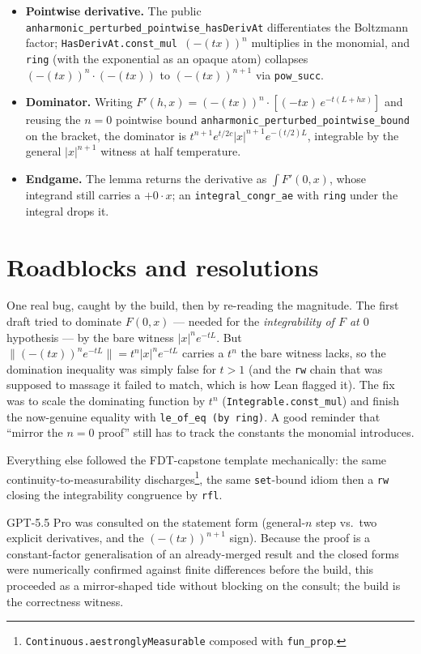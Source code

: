 \documentclass[11pt]{article}
\begin{document}
\begin{itemize}[itemsep=2pt]
\item \textbf{Pointwise derivative.} The public
  \texttt{anharmonic\_perturbed\_pointwise\_hasDerivAt} differentiates the
  Boltzmann factor; \texttt{HasDerivAt.const\_mul $(-(tx))^n$} multiplies in
  the monomial, and \texttt{ring} (with the exponential as an opaque atom)
  collapses $(-(tx))^n\cdot(-(tx))$ to $(-(tx))^{n+1}$ via \texttt{pow\_succ}.
\item \textbf{Dominator.} Writing $F'(h,x)=(-(tx))^n\cdot[(-tx)\,e^{-t(L+hx)}]$
  and reusing the $n=0$ pointwise bound
  \texttt{anharmonic\_perturbed\_pointwise\_bound} on the bracket, the
  dominator is $t^{n+1} e^{t/2c} |x|^{n+1} e^{-(t/2)L}$, integrable by the
  general $|x|^{n+1}$ witness at half temperature.
\item \textbf{Endgame.} The lemma returns the derivative as
  $\int F'(0,x)$, whose integrand still carries a $+0\cdot x$; an
  \texttt{integral\_congr\_ae} with \texttt{ring} under the integral drops it.
\end{itemize}

\section{Roadblocks and resolutions}

One real bug, caught by the build, then by re-reading the magnitude. The
first draft tried to dominate $F(0,x)$ — needed for the \emph{integrability
of $F$ at $0$} hypothesis — by the bare witness $|x|^n e^{-tL}$. But
$\|(-(tx))^n e^{-tL}\| = t^n |x|^n e^{-tL}$ carries a $t^n$ the bare witness
lacks, so the domination inequality was simply false for $t>1$ (and the
\texttt{rw} chain that was supposed to massage it failed to match, which is
how Lean flagged it). The fix was to scale the dominating function by $t^n$
(\texttt{Integrable.const\_mul}) and finish the now-genuine equality with
\texttt{le\_of\_eq (by ring)}. A good reminder that ``mirror the $n=0$
proof'' still has to track the constants the monomial introduces.

Everything else followed the FDT-capstone template mechanically: the same
continuity-to-measurability discharges\footnote{%
\texttt{Continuous.aestronglyMeasurable} composed with \texttt{fun\_prop}.},
the same \texttt{set}-bound idiom then a \texttt{rw} closing the
integrability congruence by \texttt{rfl}.

GPT-5.5 Pro was consulted on the statement form (general-$n$ step vs.\ two
explicit derivatives, and the $(-(tx))^{n+1}$ sign). Because the proof is a
constant-factor generalisation of an already-merged result and the closed
forms were numerically confirmed against finite differences before the
build, this proceeded as a mirror-shaped tide without blocking on the
consult; the build is the correctness witness.
\end{document}
